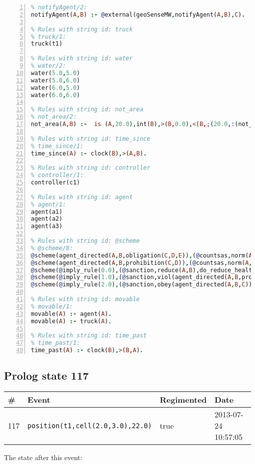 \documentclass[11pt]{article}\usepackage[utf8]{inputenc}\usepackage{geometry}
\begin{document}
\begin{lstlisting}[language=Prolog, numbers=left]
% Rules with string id: notifyAgent
% notifyAgent/2:
notifyAgent(A,B) :- @external(geoSenseMW,notifyAgent(A,B),C).

% Rules with string id: truck
% truck/1:
truck(t1)

% Rules with string id: water
% water/2:
water(5.0,5.0)
water(5.0,6.0)
water(6.0,5.0)
water(6.0,6.0)

% Rules with string id: not_area
% not_area/2:
not_area(A,B) :-  is (A,20.0),int(B),>(B,0.0),<(B,;(20.0,:(not_area(A,B), is (-(B),20.0)))),int(A),>(A,0.0),<(A,;(20.0,:(area(A,B),-(int(A))))),int(B),>(A,0.0),>(B,0.0),<(A,21.0),<(B,21.0).

% Rules with string id: time_since
% time_since/1:
time_since(A) :- clock(B),>(A,B).

% Rules with string id: controller
% controller/1:
controller(c1)

% Rules with string id: agent
% agent/1:
agent(a1)
agent(a2)
agent(a3)

% Rules with string id: @scheme
% @scheme/8:
@scheme(agent_directed(A,B,obligation(C,D,E)),(@countsas,norm(A,B,F,obligation(C,D,E)),F),false,(listTrue(C)),(time_past(D)),false,[plus(viol(agent_directed(A,B,obligation(C,D,E))))|[]],[plus(obey(agent_directed(A,B,obligation(C,D,E))))|[]])
@scheme(agent_directed(A,B,prohibition(C,D)),(@countsas,norm(A,B,E,prohibition(C,D)),E),(listTrue(C)),false,(false),false,[plus(viol(agent_directed(A,B,prohibition(C,D))))|[]],[plus(obey(agent_directed(A,B,prohibition(C,D))))|[]])
@scheme(@imply_rule(0.0),(@sanction,reduce(A,B),do_reduce_health(A,B),notifyAgent(A,changed(status))),true,false,false,false,[min(reduce(A,B))|[]],[])
@scheme(@imply_rule(1.0),(@sanction,viol(agent_directed(A,B,prohibition(C,D))),do_sanction(D)),true,false,false,false,[min(viol(agent_directed(A,B,prohibition(C,D))))|[]],[])
@scheme(@imply_rule(2.0),(@sanction,obey(agent_directed(A,B,C))),true,false,false,false,[min(obey(agent_directed(A,B,C)))|[]],[])

% Rules with string id: movable
% movable/1:
movable(A) :- agent(A).
movable(A) :- truck(A).

% Rules with string id: time_past
% time_past/1:
time_past(A) :- clock(B),>(B,A).

\end{lstlisting}
\clearpage 
\subsection{Prolog state 117}
\begin{table}[ht]
\centering 
\begin{tabular}{l l l l} 
\textbf{\#} & \textbf{Event} & \textbf{Regimented} & \textbf{Date} \\ [0.5ex] 
\hline
117&\texttt{position(t1,cell(2.0,3.0),22.0)}&true&2013-07-24 10:57:05\\ [1ex] \hline\end{tabular}
\end{table}
The state after this event:
\end{document}
